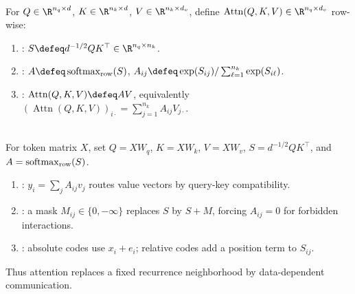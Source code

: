 \begin{definition} \label{def:sl-attention} \\
For $Q\in\R^{n_q\times d}$, $K\in\R^{n_k\times d}$, $V\in\R^{n_k\times d_v}$, define $\operatorname{Attn}(Q,K,V)\in\R^{n_q\times d_v}$ row-wise:
\begin{enumerate}[label=(\roman*)]
\setlength{\itemsep}{0pt}
\item {}: $S\defeq d^{-1/2}QK^\top\in\R^{n_q\times n_k}$.
\item {}: $A\defeq\operatorname{softmax}_{\rm row}(S)$, $A_{ij}\defeq\exp(S_{ij})/\sum_{\ell=1}^{n_k}\exp(S_{i\ell})$.
\item {}: $\operatorname{Attn}(Q,K,V)\defeq AV$, equivalently $(\operatorname{Attn}(Q,K,V))_{i\cdot}=\sum_{j=1}^{n_k}A_{ij}V_{j\cdot}$.
\end{enumerate}
\end{definition}

\begin{remark} \label{rem:sl-attention-as-routing} \\
For token matrix $X$, set $Q=XW_q$, $K=XW_k$, $V=XW_v$, $S=d^{-1/2}QK^\top$, and $A=\operatorname{softmax}_{\rm row}(S)$.
\begin{enumerate}[label=(\roman*)]
\setlength{\itemsep}{0pt}
\item {}: $y_i=\sum_j A_{ij}v_j$ routes value vectors by query-key compatibility.
\item {}: a mask $M_{ij}\in\{0,-\infty\}$ replaces $S$ by $S+M$, forcing $A_{ij}=0$ for forbidden interactions.
\item {}: absolute codes use $x_i+e_i$; relative codes add a position term to $S_{ij}$.
\end{enumerate}
Thus attention replaces a fixed recurrence neighborhood by data-dependent communication.
\end{remark}
